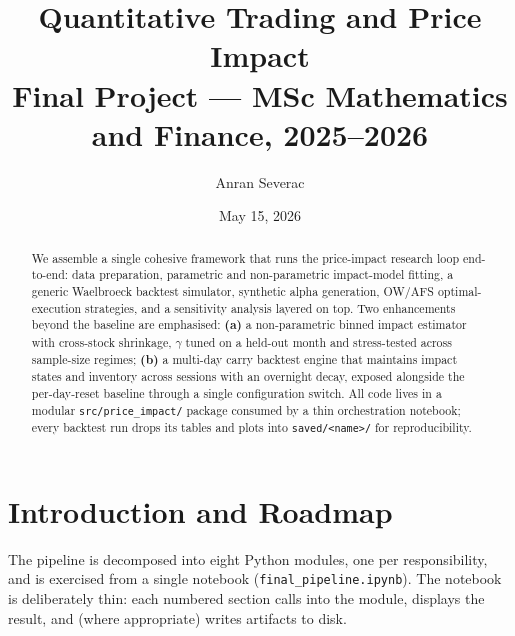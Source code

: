 \documentclass[11pt,a4paper]{article}
\title{Quantitative Trading and Price Impact\\
       \large Final Project --- MSc Mathematics and Finance, 2025--2026}
\author{Anran Severac}
\date{May 15, 2026}
\begin{document}
\maketitle

\begin{abstract}
\noindent
We assemble a single cohesive framework that runs the price-impact
research loop end-to-end: data preparation, parametric and non-parametric
impact-model fitting, a generic Waelbroeck backtest simulator, synthetic
alpha generation, OW/AFS optimal-execution strategies, and a sensitivity
analysis layered on top.  Two enhancements beyond the baseline are
emphasised: \textbf{(a)} a non-parametric binned impact estimator with
cross-stock shrinkage, $\gamma$ tuned on a held-out month and stress-tested
across sample-size regimes; \textbf{(b)} a multi-day carry backtest engine
that maintains impact states and inventory across sessions with an
overnight decay, exposed alongside the per-day-reset baseline through a
single configuration switch.  All code lives in a modular
\texttt{src/price\_impact/} package consumed by a thin orchestration
notebook; every backtest run drops its tables and plots into
\texttt{saved/<name>/} for reproducibility.
\end{abstract}

\section{Introduction and Roadmap}

The pipeline is decomposed into eight Python modules, one per
responsibility, and is exercised from a single notebook
(\texttt{final\_pipeline.ipynb}).  The notebook is deliberately thin:
each numbered section calls into the module, displays the result,
and (where appropriate) writes artifacts to disk.
\end{document}
